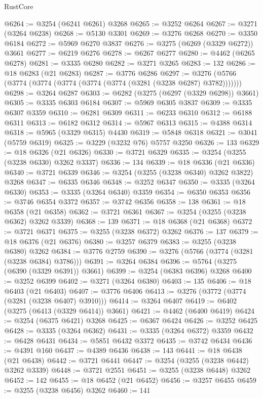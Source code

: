 \begin{lexlean}{RustCore}
\begin{coremodule}
@6264 := @3254 (@6241 @6261) @3268
@6265 := @3252 @6264
@6267 := @3271 (@3264 @6238)
@6268 := @5130 @3301
@6269 := @3276 @6268
@6270 := @3350 @6184
@6272 := @5969 @6270 @3837
@6276 := @3275 (@6269 (@3329 @6272)) @3661
@6277 := @6219 @6276
@6278 := @6267 @6277
@6280 := @4462 (@6265 @6278)
@6281 := @3335 @6280
@6282 := @3271 @3265
@6283 := 132
@6286 := @18 @6283 (@21 @6283)
@6287 := @3776 @6286
@6297 := @3276 (@5766 (@3774 (@3774 (@3774 (@3774 (@3774 (@3281 (@3238 @6287) @3782)))))))
@6298 := @3264 @6287
@6303 := @6282 (@3275 (@6297 (@3329 @6298)) @3661)
@6305 := @3335 @6303 @6184
@6307 := @5969 @6305 @3837
@6309 := @3335 @6307 @3359
@6310 := @6281 @6309
@6311 := @6233 @6310
@6312 := @6188 @6311
@6313 := @6182 @6312
@6314 := @5967 @6313
@6315 := @4388 @6314
@6318 := @5965 (@3329 @6315) @4430
@6319 := @5848 @6318
@6321 := @3041 (@5759 @6319)
@6325 := @3229 (@3232 @76) @5757 @3250
@6326 := 133
@6329 := @18 @6326 (@21 @6326)
@6330 := @3721 @6329
@6335 := @3254 (@3255 (@3238 @6330) @3262 @3337)
@6336 := 134
@6339 := @18 @6336 (@21 @6336)
@6340 := @3721 @6339
@6346 := @3254 (@3255 (@3238 @6340) @3262 @3822) @3268
@6347 := @6335 @6346
@6348 := @3252 @6347
@6350 := @3335 (@3264 @6330)
@6353 := @3335 (@3264 @6340) @3359
@6354 := @6350 @6353
@6356 := @3746 @6354 @3372
@6357 := @3742 @6356
@6358 := 138
@6361 := @18 @6358 (@21 @6358)
@6362 := @3721 @6361
@6367 := @3254 (@3255 (@3238 @6362) @3262 @3339)
@6368 := 139
@6371 := @18 @6368 (@21 @6368)
@6372 := @3721 @6371
@6375 := @3255 (@3238 @6372) @3262
@6376 := 137
@6379 := @18 @6376 (@21 @6376)
@6380 := @3257 @6379
@6383 := @3255 (@3238 @6380) @3262
@6384 := @3776 @2759
@6390 := @3276 (@5766 (@3774 (@3281 (@3238 @6384) @3786)))
@6391 := @3264 @6384
@6396 := @5764 (@3275 (@6390 (@3329 @6391)) @3661)
@6399 := @3254 (@6383 @6396) @3268
@6400 := @3252 @6399
@6402 := @3271 (@3264 @6380)
@6403 := 135
@6406 := @18 @6403 (@21 @6403)
@6407 := @3776 @6406
@6413 := @3276 (@3772 (@3774 (@3281 (@3238 @6407) @3910)))
@6414 := @3264 @6407
@6419 := @6402 (@3275 (@6413 (@3329 @6414)) @3661)
@6421 := @4462 (@6400 @6419)
@6424 := @3254 (@6375 @6421) @3268
@6425 := @6367 @6424
@6426 := @3252 @6425
@6428 := @3335 (@3264 @6362)
@6431 := @3335 (@3264 @6372) @3359
@6432 := @6428 @6431
@6434 := @5851 @6432 @3372
@6435 := @3742 @6434
@6436 := @4391 @160
@6437 := @4389 @6436
@6438 := 143
@6441 := @18 @6438 (@21 @6438)
@6442 := @3721 @6441
@6447 := @3254 (@3255 (@3238 @6442) @3262 @3339)
@6448 := @3721 @2551
@6451 := @3255 (@3238 @6448) @3262
@6452 := 142
@6455 := @18 @6452 (@21 @6452)
@6456 := @3257 @6455
@6459 := @3255 (@3238 @6456) @3262
@6460 := 141

\end{coremodule}
\end{lexlean}
